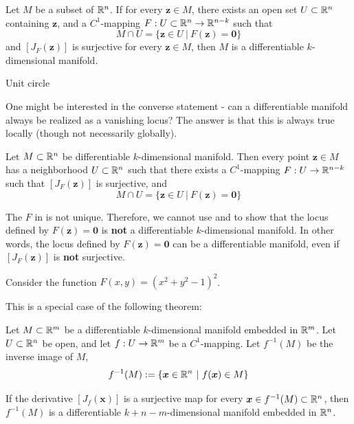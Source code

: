     
    \begin{theorem} \label{implicitglobal}
    Let $M$ be a subset of $\mathbb{R}^n$.  If for every $\bm{z} \in M$, there exists an open set $U  \subset \mathbb{R}^n$ containing $\bm{z}$, and a $C^1$-mapping $F : U \subset \mathbb{R}^n \to \mathbb{R}^{n-k}$ such that 
    $$M \cap U = \{\bm{z} \in U \ | \ F(\bm{z}) = \bm{0} \}$$
    and $[J_F(\bm{z})]$ is surjective for every $\bm{z} \in M$, then $M$ is a differentiable $k$-dimensional manifold.
    \end{theorem}

    \begin{example}
        Unit circle
    \end{example}

One might be interested in the converse statement - can a differentiable manifold always be realized as a vanishing locus?  The answer is that this is always true locally (though not necessarily globally).

    \begin{theorem} \label{manifoldimplicit}
    Let $M \subset \mathbb{R}^n$ be differentiable $k$-dimensional manifold.  Then every point $\bm{z} \in M$ has a neighborhood $U \subset \mathbb{R}^n$ such that there exists a $C^1$-mapping $F : U \to \mathbb{R}^{n-k}$ such that $[J_F(\bm{z})]$ is surjective, and
    $$M \cap U = \{\bm{z} \in U \ | \ F(\bm{z}) = \bm{0} \}$$
    
    \end{theorem}
    
    \begin{remark}
    The $F$ in  is not unique.  Therefore, we cannot use  and  to show that the locus defined by $F(\bm{z}) = \bm{0}$ is \textbf{not} a differentiable $k$-dimensional manifold.  In other words, the locus defined by $F(\bm{z}) = \bm{0}$ can be a differentiable manifold, even if $[J_F(\bm{z})]$ is \textbf{not} surjective. 
    \end{remark}

    \begin{example}
        Consider the function $F(x,y) = (x^2 + y^2 - 1)^2$.  
    \end{example}


This is a special case of the following theorem:

\begin{theorem}
Let $M \subset \mathbb{R}^m$ be a differentiable $k$-dimensional manifold embedded in $\mathbb{R}^m$.   Let $U \subset \mathbb{R}^n$ be open, and let $f : U \to \mathbb{R}^{m}$ be a $C^1$-mapping.
Let $f^{-1}(M)$ be the inverse image of $M$, 
$$f^{-1}(M) := \{\bm{x} \in \R^n \ | \ f(\bm{x}) \in M \}$$

If the derivative $[J_f(\bm{x})]$ is a surjective map for every $\bm{x} \in f^{-1}(M) \subset \mathbb{R}^n$, then $f^{-1}(M)$ is a differentiable $k + n - m$-dimensional manifold embedded in $\mathbb{R}^n$.
\end{theorem}

